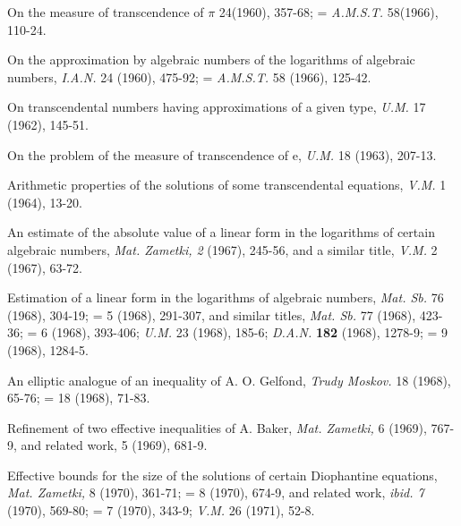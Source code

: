 \begin{hanglist}
    \item \hspace{1.5em} On the measure of transcendence of \(\pi\) 24(1960), 357-68; = \textit{A.M.S.T.} 58(1966), 110-24.
    \item \hspace{1.5em} On the approximation by algebraic numbers of the logarithms of algebraic numbers, \textit{I.A.N.} 24 (1960), 475-92; = \textit{A.M.S.T.} 58 (1966), 125-42.
    \item \hspace{1.5em} On transcendental numbers having approximations of a given type, \textit{U.M.} 17 (1962), 145-51.
    \item \hspace{1.5em} On the problem of the measure of transcendence of e, \textit{U.M.} 18 (1963), 207-13.
    \item \hspace{1.5em} Arithmetic properties of the solutions of some transcendental equations, \textit{V.M.} 1 (1964), 13-20.
    \item \hspace{1.5em} An estimate of the absolute value of a linear form in the logarithms of certain algebraic numbers, \textit{Mat. Zametki, 2} (1967), 245-56, and a similar title, \textit{V.M.} 2 (1967), 63-72.
    \item \hspace{1.5em} Estimation of a linear form in the logarithms of algebraic numbers, \textit{Mat. Sb.} 76 (1968), 304-19; = 5 (1968), 291-307, and similar titles, \textit{Mat. Sb.} 77 (1968), 423-36; = 6 (1968), 393-406; \textit{U.M.} 23 (1968), 185-6; \textit{D.A.N.} \textbf{182} (1968), 1278-9; = 9 (1968), 1284-5.
    \item \hspace{1.5em} An elliptic analogue of an inequality of A. O. Gelfond, \textit{Trudy Moskov.} 18 (1968), 65-76; = 18 (1968), 71-83.
    \item \hspace{1.5em} Refinement of two effective inequalities of A. Baker, \textit{Mat. Zametki,} 6 (1969), 767-9, and related work, 5 (1969), 681-9.
    \item \hspace{1.5em} Effective bounds for the size of the solutions of certain Diophantine equations, \textit{Mat. Zametki,} 8 (1970), 361-71; = 8 (1970), 674-9, and related work, \textit{ibid. 7} (1970), 569-80; = 7 (1970), 343-9; \textit{V.M.} 26 (1971), 52-8.

\end{hanglist}
